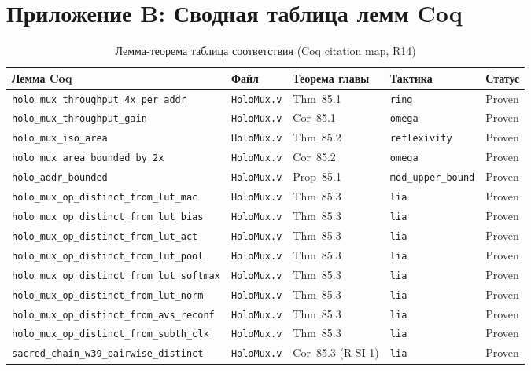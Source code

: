 \section*{Приложение B: Сводная таблица лемм Coq}
\label{sec:appendix-coq-table}

\begin{table}[ht]
\centering
\caption{Лемма-теорема таблица соответствия (Coq citation map, R14)}
\label{tab:coq-citation-map}
\begin{tabular}{@{}lllll@{}}
\toprule
Лемма Coq & Файл & Теорема главы & Тактика & Статус \\
\midrule
\texttt{holo\_mux\_throughput\_4x\_per\_addr}
  & \texttt{HoloMux.v} & Thm~85.1 & \texttt{ring} & Proven \\
\texttt{holo\_mux\_throughput\_gain}
  & \texttt{HoloMux.v} & Cor~85.1 & \texttt{omega} & Proven \\
\texttt{holo\_mux\_iso\_area}
  & \texttt{HoloMux.v} & Thm~85.2 & \texttt{reflexivity} & Proven \\
\texttt{holo\_mux\_area\_bounded\_by\_2x}
  & \texttt{HoloMux.v} & Cor~85.2 & \texttt{omega} & Proven \\
\texttt{holo\_addr\_bounded}
  & \texttt{HoloMux.v} & Prop~85.1 & \texttt{mod\_upper\_bound} & Proven \\
\texttt{holo\_mux\_op\_distinct\_from\_lut\_mac}
  & \texttt{HoloMux.v} & Thm~85.3 & \texttt{lia} & Proven \\
\texttt{holo\_mux\_op\_distinct\_from\_lut\_bias}
  & \texttt{HoloMux.v} & Thm~85.3 & \texttt{lia} & Proven \\
\texttt{holo\_mux\_op\_distinct\_from\_lut\_act}
  & \texttt{HoloMux.v} & Thm~85.3 & \texttt{lia} & Proven \\
\texttt{holo\_mux\_op\_distinct\_from\_lut\_pool}
  & \texttt{HoloMux.v} & Thm~85.3 & \texttt{lia} & Proven \\
\texttt{holo\_mux\_op\_distinct\_from\_lut\_softmax}
  & \texttt{HoloMux.v} & Thm~85.3 & \texttt{lia} & Proven \\
\texttt{holo\_mux\_op\_distinct\_from\_lut\_norm}
  & \texttt{HoloMux.v} & Thm~85.3 & \texttt{lia} & Proven \\
\texttt{holo\_mux\_op\_distinct\_from\_avs\_reconf}
  & \texttt{HoloMux.v} & Thm~85.3 & \texttt{lia} & Proven \\
\texttt{holo\_mux\_op\_distinct\_from\_subth\_clk}
  & \texttt{HoloMux.v} & Thm~85.3 & \texttt{lia} & Proven \\
\texttt{sacred\_chain\_w39\_pairwise\_distinct}
  & \texttt{HoloMux.v} & Cor~85.3 (R-SI-1) & \texttt{lia} & Proven \\
\bottomrule
\end{tabular}
\end{table}

